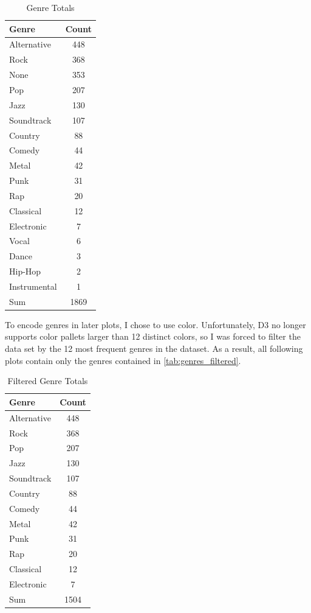 \documentclass[journal]{vgtc}                %
\begin{document}
\begin{table}[h]
  \caption{Genre Totals}
  \label{tab:genres}
  \scriptsize%
	\centering%
  \begin{tabu}{l c}
  \toprule
    Genre & Count \\
  \midrule
    Alternative & 448 \\
    Rock & 368 \\
    None & 353 \\
    Pop & 207 \\
    Jazz & 130 \\
    Soundtrack & 107 \\
    Country & 88 \\
    Comedy & 44 \\
    Metal & 42 \\
    Punk & 31 \\
    Rap & 20 \\
    Classical & 12 \\
    Electronic & 7 \\
    Vocal & 6 \\
    Dance & 3 \\
    Hip-Hop & 2 \\
    Instrumental & 1 \\
  \midrule
    Sum & 1869 \\
  \bottomrule
  \end{tabu}%
\end{table}

To encode genres in later plots, I chose to use color. Unfortunately, D3 no
longer supports color pallets larger than 12 distinct colors, so I was forced
to filter the data set by the 12 most frequent genres in the dataset. As a
result, all following plots contain only the genres contained in
\autoref{tab:genres_filtered}.

\begin{table}[h]
  \caption{Filtered Genre Totals}
  \label{tab:genres_filtered}
  \scriptsize%
	\centering%
  \begin{tabu}{l c}
  \toprule
    Genre & Count \\
  \midrule
    Alternative & 448 \\
    Rock & 368 \\
    Pop & 207 \\
    Jazz & 130 \\
    Soundtrack & 107 \\
    Country & 88 \\
    Comedy & 44 \\
    Metal & 42 \\
    Punk & 31 \\
    Rap & 20 \\
    Classical & 12 \\
    Electronic & 7 \\
  \midrule
    Sum & 1504 \\
  \bottomrule
  \end{tabu}%
\end{table}
\end{document}
